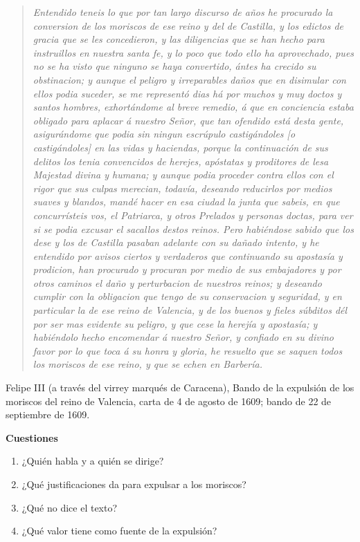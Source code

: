 \documentclass{book}
\begin{document}
\begin{tcolorbox}[title={Ejercicio resuelto}, studiumworked, breakable]
\begin{quote}
\itshape Entendido teneis lo que por tan largo discurso de años he procurado la conversion de los moriscos de ese reino y del de Castilla, y los edictos de gracia que se les concedieron, y las diligencias que se han hecho para instruillos en nuestra santa fe, y lo poco que todo ello ha aprovechado, pues no se ha visto que ninguno se haya convertido, ántes ha crecido su obstinacion; y aunque el peligro y irreparables daños que en disimular con ellos podia suceder, se me representó dias há por muchos y muy doctos y santos hombres, exhortándome al breve remedio, á que en conciencia estaba obligado para aplacar á nuestro Señor, que tan ofendido está desta gente, asigurándome que podia sin ningun escrúpulo castigándoles [o castigándoles] en las vidas y haciendas, porque la continuación de sus delitos los tenia convencidos de herejes, apóstatas y proditores de lesa Majestad divina y humana; y aunque podia proceder contra ellos con el rigor que sus culpas merecian, todavía, deseando reducirlos por medios suaves y blandos, mandé hacer en esa ciudad la junta que sabeis, en que concurrísteis vos, el Patriarca, y otros Prelados y personas doctas, para ver si se podia excusar el sacallos destos reinos. Pero habiéndose sabido que los dese y los de Castilla pasaban adelante con su dañado intento, y he entendido por avisos ciertos y verdaderos que continuando su apostasía y prodicion, han procurado y procuran por medio de sus embajadores y por otros caminos el daño y perturbacion de nuestros reinos; y deseando cumplir con la obligacion que tengo de su conservacion y seguridad, y en particular la de ese reino de Valencia, y de los buenos y fieles súbditos dél por ser mas evidente su peligro, y que cese la herejía y apostasía; y habiéndolo hecho encomendar á nuestro Señor, y confiado en su divino favor por lo que toca á su honra y gloria, he resuelto que se saquen todos los moriscos de ese reino, y que se echen en Barbería.
\end{quote}
{\noindent\footnotesize Felipe III (a través del virrey marqués de Caracena), Bando de la expulsión de los moriscos del reino de Valencia, carta de 4 de agosto de 1609; bando de 22 de septiembre de 1609.\par}

\noindent\textbf{Cuestiones}
\begin{enumerate}
\item ¿Quién habla y a quién se dirige?
\item ¿Qué justificaciones da para expulsar a los moriscos?
\item ¿Qué no dice el texto?
\item ¿Qué valor tiene como fuente de la expulsión?
\end{enumerate}


\end{tcolorbox}
\end{document}
